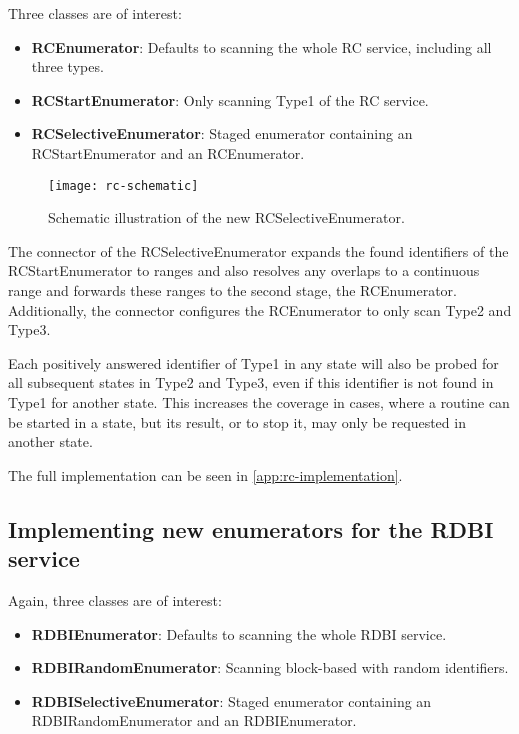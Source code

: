 Three classes are of interest:

\begin{itemize}
    \item \textbf{RCEnumerator}: Defaults to scanning the whole RC service, including all three types.
    \item \textbf{RCStartEnumerator}: Only scanning Type1 of the RC service.
    \item \textbf{RCSelectiveEnumerator}: Staged enumerator containing an RCStartEnumerator and an RCEnumerator.
\end{itemize}

\begin{figure}[h]
    \centering
    \texttt{[image: rc-schematic]}
    \caption{Schematic illustration of the new RCSelectiveEnumerator.}
    \label{fig:rc-schematic}
\end{figure}

The connector of the RCSelectiveEnumerator expands the found identifiers of the RCStartEnumerator to ranges and also resolves any overlaps to a continuous range and forwards these ranges to the second stage, the RCEnumerator. Additionally, the connector configures the RCEnumerator to only scan Type2 and Type3.

Each positively answered identifier of Type1 in any state will also be probed for all subsequent states in Type2 and Type3, even if this identifier is not found in Type1 for another state. This increases the coverage in cases, where a routine can be started in a state, but its result, or to stop it, may only be requested in another state.

The full implementation can be seen in \autoref{app:rc-implementation}.

\subsection{Implementing new enumerators for the RDBI service}

Again, three classes are of interest:

\begin{itemize}
    \item \textbf{RDBIEnumerator}: Defaults to scanning the whole RDBI service.
    \item \textbf{RDBIRandomEnumerator}: Scanning block-based with random identifiers.
    \item \textbf{RDBISelectiveEnumerator}: Staged enumerator containing an RDBIRandomEnumerator and an RDBIEnumerator.
\end{itemize}

